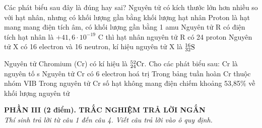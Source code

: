 \documentclass[11pt,a4paper]{article}
\begin{document}
\begin{ex}
Các phát biểu sau đây là đúng hay sai?
\choiceTF
{\True Nguyên tử có kích thước lớn hơn nhiều so với hạt nhân, nhưng có khối lượng gần bằng khối lượng hạt nhân}
{Proton là hạt mang mang điện tích âm, có khối lượng gần bằng 1 amu}
{Nguyên tử R có điện tích hạt nhân là $+41,6\cdot 10^{-19}\text{ C}$ thì hạt nhân nguyên tử R có 24 proton}
{Nguyên tử X có 16 electron và 16 neutron, kí hiệu nguyên tử X là $^{16}_{32}\ce{S}$}
\end{ex}
\begin{ex}
Nguyên tử Chromium (Cr) có kí hiệu là $^{52}_{24}\ce{Cr}$. Cho các phát biểu sau:
\choiceTF
{Cr là nguyên tố s}
{\True Nguyên tử Cr có 6 electron hoá trị}
{\True Trong bảng tuần hoàn Cr thuộc nhóm VIB}
{\True Trong nguyên tử Cr số hạt không mang điện chiếm khoảng 53,85\% về khối lượng nguyên tử}
\end{ex}
\vspace{4pt}
\noindent
{\color{mainGreen}\textbf{\large PHẦN III (2 điểm). TRẮC NGHIỆM TRẢ LỜI NGẮN}}\\
\textit{\small Thí sinh trả lời từ câu 1 đến câu 4. Viết câu trả lời vào ô quy định.}
\vspace{2pt}
\end{document}
